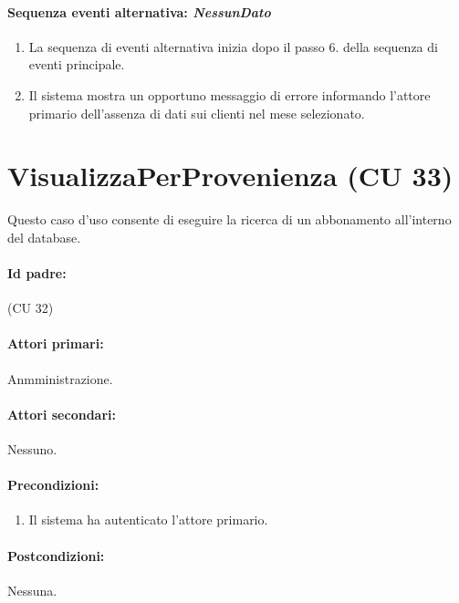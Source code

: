 \documentclass{article}
\begin{document}
		\paragraph{Sequenza eventi alternativa: \textit{NessunDato}}
	\begin{enumerate}	[leftmargin=28pt]
			\item  La sequenza di eventi alternativa inizia dopo il passo 6. della sequenza di eventi principale.
			\item  Il sistema mostra un opportuno messaggio di errore informando l'attore primario dell'assenza di dati sui clienti nel mese selezionato.
		\end{enumerate}
	





\newpage
\section*{VisualizzaPerProvenienza (CU 33)}
	
	Questo caso d'uso consente di eseguire la ricerca di un abbonamento all'interno del database.
	
	\paragraph{Id padre:} (CU 32)
	
	\paragraph{Attori primari:}Anmministrazione.
	
	\paragraph{Attori secondari:}Nessuno.
	
	\paragraph{Precondizioni:}
	\begin{enumerate}[itemsep=8pt,parsep=0pt]
		\item Il sistema ha autenticato l'attore primario.
	\end{enumerate}
	
	\paragraph{Postcondizioni:}Nessuna.
	
\end{document}
